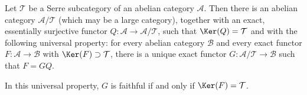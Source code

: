 \begin{theorem}\label{prop:Serre-quotient}
Let $\mathcal{T}$ be a Serre subcategory of an abelian category
$\mathcal{A}$. Then there is an abelian category
$\mathcal{A}/\mathcal{T}$ (which may be a large category), together with an
exact, essentially surjective functor
$Q:\mathcal{A}\to\mathcal{A}/\mathcal{T}$, such that
$\Ker(Q)=\mathcal{T}$ and with the following universal property: for every
abelian category $\mathcal{B}$ and every exact functor
$F:\mathcal{A}\to\mathcal{B}$ with $\Ker(F)\supset\mathcal{T}$, there is a
unique exact functor $G:\mathcal{A}/\mathcal{T}\to\mathcal{B}$ such that
$F=GQ$.

In this universal property, $G$ is faithful if and only if
$\Ker(F)=\mathcal{T}$.
\end{theorem}

